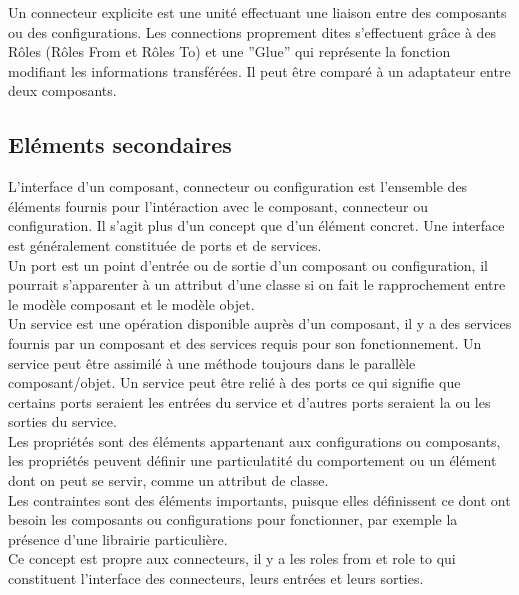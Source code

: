 \documentclass[11pt,a4paper]{article}
\begin{document}
Un connecteur explicite est une unité effectuant une liaison entre des
composants ou des configurations. Les connections proprement dites s'effectuent
grâce à des Rôles (Rôles From et Rôles To) et une ''Glue'' qui représente la
fonction modifiant les informations transférées. Il peut être comparé à un
adaptateur entre deux composants.\\

\subsection{Eléments secondaires}

L'interface d'un composant, connecteur ou configuration est l'ensemble des
éléments fournis pour l'intéraction avec le composant, connecteur ou
configuration. Il s'agit plus d'un concept que d'un élément concret. Une
interface est généralement constituée de ports et de services.\\

Un port est un point d'entrée ou de sortie d'un composant ou configuration, il
pourrait s'apparenter à un attribut d'une classe si on fait le rapprochement
entre le modèle composant et le modèle objet.\\

Un service est une opération disponible auprès d'un composant, il y a des
services fournis par un composant et des services requis pour son fonctionnement.
Un service peut être assimilé à une méthode toujours dans le parallèle
composant/objet. Un service peut être relié à des ports ce qui signifie que
certains ports seraient les entrées du service et d'autres ports seraient la ou
les sorties du service.\\

Les propriétés sont des éléments appartenant aux configurations ou composants,
les propriétés peuvent définir une particulatité du comportement ou un élément
dont on peut se servir, comme un attribut de classe.\\

Les contraintes sont des éléments importants, puisque elles définissent ce dont
ont besoin les composants ou configurations pour fonctionner,  par exemple la
présence d'une librairie particulière.\\

Ce concept est propre aux connecteurs, il y a les roles from et role to qui
constituent l'interface des connecteurs, leurs entrées et leurs sorties.\\
\end{document}
